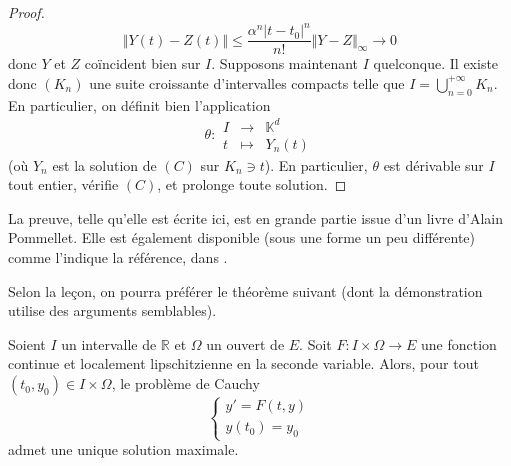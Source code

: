 \begin{proof}
    \[ \Vert Y(t) - Z(t) \Vert \leq \frac{\alpha^n |t-t_0|^n}{n!} \Vert Y-Z \Vert_{\infty} \longrightarrow 0 \]
    donc $Y$ et $Z$ coïncident bien sur $I$.
    \newpar
    Supposons maintenant $I$ quelconque. Il existe donc $(K_n)$ une suite croissante d'intervalles compacts telle que $I = \bigcup_{n = 0}^{+\infty} K_n$. En particulier, on définit bien l'application
    \[
    \theta :
    \begin{array}{ccc}
      I &\rightarrow& \mathbb{K}^d \\
      t &\mapsto& Y_n(t)
    \end{array}
    \]
    (où $Y_n$ est la solution de $(C)$ sur $K_n \ni t$). En particulier, $\theta$ est dérivable sur $I$ tout entier, vérifie $(C)$, et prolonge toute solution.
  \end{proof}
  
  \begin{remark}
    La preuve, telle qu'elle est écrite ici, est en grande partie issue d'un livre d'Alain Pommellet. Elle est également disponible (sous une forme un peu différente) comme l'indique la référence, dans \cite{[DAN]}.
  \end{remark}

  Selon la leçon, on pourra préférer le théorème suivant (dont la démonstration utilise des arguments semblables).


  \begin{theorem}
    Soient $I$ un intervalle de $\mathbb{R}$ et $\Omega$ un ouvert de $E$. Soit $F : I \times \Omega \rightarrow E$ une fonction continue et localement lipschitzienne en la seconde variable. Alors, pour tout $(t_0, y_0) \in I \times \Omega$, le problème de Cauchy
    \[ \begin{cases} y'=F(t,y) \\ y(t_0) = y_0 \end{cases} \tag{$C$} \]
    admet une unique solution maximale.
  \end{theorem}


